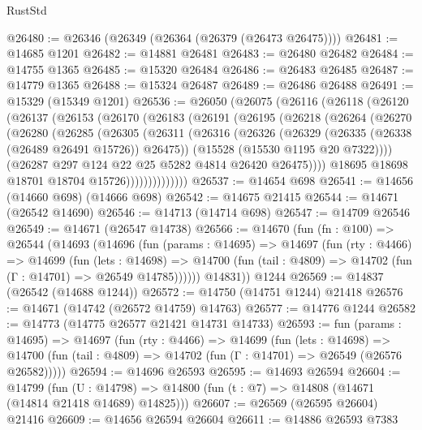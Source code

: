 \begin{lexlean}{RustStd}
\begin{coremodule}
@26480 := @26346 (@26349 (@26364 (@26379 (@26473 @26475))))
@26481 := @14685 @1201
@26482 := @14881 @26481
@26483 := @26480 @26482
@26484 := @14755 @1365
@26485 := @15320 @26484
@26486 := @26483 @26485
@26487 := @14779 @1365
@26488 := @15324 @26487
@26489 := @26486 @26488
@26491 := @15329 (@15349 @1201)
@26536 := @26050
    (@26075
      (@26116
        (@26118
          (@26120
            (@26137
              (@26153
                (@26170
                  (@26183
                    (@26191
                      (@26195
                        (@26218
                          (@26264
                            (@26270
                              (@26280
                                (@26285
                                  (@26305
                                    (@26311
                                      (@26316
                                        (@26326
                                          (@26329 (@26335 (@26338 (@26489 @26491 @15726)) @26475))
                                          (@15528 (@15530 @1195 @20 @7322))))
                                      (@26287 @297 @124 @22 @25 @5282 @4814 @26420 @26475))))
                                @18695
                                @18698
                                @18701
                                @18704
                                @15726))))))))))))))
@26537 := @14654 @698
@26541 := @14656 (@14660 @698) (@14666 @698)
@26542 := @14675 @21415
@26544 := @14671 (@26542 @14690)
@26546 := @14713 (@14714 @698)
@26547 := @14709 @26546
@26549 := @14671 (@26547 @14738)
@26566 := @14670
    (fun (fn : @100) =>
    @26544
      (@14693
        (@14696
          (fun (params : @14695) =>
          @14697
            (fun (rty : @4466) =>
            @14699
              (fun (lets : @14698) =>
              @14700 (fun (tail : @4809) => @14702 (fun (Γ : @14701) => @26549 @14785))))))
        @14831))
    @1244
@26569 := @14837 (@26542 (@14688 @1244))
@26572 := @14750 (@14751 @1244) @21418
@26576 := @14671 (@14742 (@26572 @14759) @14763)
@26577 := @14776 @1244
@26582 := @14773 (@14775 @26577 @21421 @14731 @14733)
@26593 := fun (params : @14695) =>
  @14697
    (fun (rty : @4466) =>
    @14699
      (fun (lets : @14698) =>
      @14700 (fun (tail : @4809) => @14702 (fun (Γ : @14701) => @26549 (@26576 @26582)))))
@26594 := @14696 @26593
@26595 := @14693 @26594
@26604 := @14799
    (fun (U : @14798) => @14800 (fun (t : @7) => @14808 (@14671 (@14814 @21418 @14689) @14825)))
@26607 := @26569 (@26595 @26604) @21416
@26609 := @14656 @26594 @26604
@26611 := @14886 @26593 @7383

\end{coremodule}
\end{lexlean}
